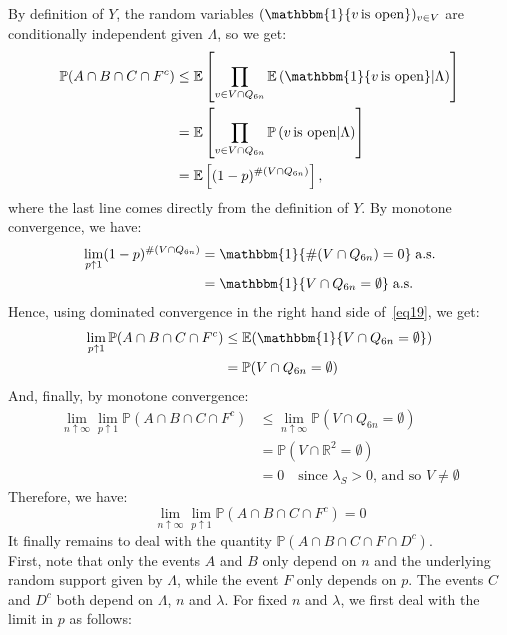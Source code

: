 \documentclass[10pt,a4paper]{amsart}
\theoremstyle{exampstyle}
\theoremstyle{exampnotations}
\begin{document}
By definition of $Y$, the random variables $(\mathbbm{1} \lbrace v \, \text{is open} \rbrace )_{v \in V}$ are conditionally independent given $\Lambda$, so we get:
\begin{align}
    \nonumber \mathbb{P}(A \cap B \cap C \cap F^c) &\leq \mathbb{E}\left[\prod_{v \in V \cap Q_{6n}}\mathbb{E}\left( \mathbbm{1}\lbrace v \, \text{is open} \rbrace \vert \Lambda \right)\right]
    \\ \nonumber &= \mathbb{E}\left[\prod_{v \in V \cap Q_{6n}}\mathbb{P}\left( v \, \text{is open} \vert \Lambda \right)\right]
    \\ \label{eq19} &= \mathbb{E}\left[(1-p)^{\#(V \cap Q_{6n})}\right], 
\end{align}
where the last line comes directly from the definition of $Y$. By monotone convergence, we have:
\begin{align*}
  \lim_{p \uparrow 1}(1-p)^{\#(V \cap Q_{6n})} &= \mathbbm{1}\lbrace \#(V \cap Q_{6n}) = 0 \rbrace \; \text{a.s.}
  \\ &= \mathbbm{1}\lbrace V \cap Q_{6n} = \emptyset \rbrace \; \text{a.s.}  
\end{align*}
Hence, using dominated convergence in the right hand side of~\eqref{eq19}, we get:
\begin{align*}
\lim_{p \uparrow 1} \mathbb{P}(A \cap B \cap C \cap F^c) &\leq \mathbb{E}(\mathbbm{1}\lbrace V \cap Q_{6n} = \emptyset \rbrace)
\\ &= \mathbb{P}(V \cap Q_{6n} = \emptyset)
\end{align*}
And, finally, by monotone convergence:
\begin{align*}
\lim_{n \uparrow \infty}\lim_{p \uparrow 1} \mathbb{P}(A \cap B \cap C \cap F^c) &\leq \lim_{n \uparrow \infty} \mathbb{P}(V \cap Q_{6n} = \emptyset)
\\ &= \mathbb{P}(V \cap \mathbb{R}^{2} = \emptyset)
\\ &= 0 \quad \text{since $\lambda_{S} > 0$, and so $V \neq \emptyset$}
\end{align*}
Therefore, we have:
\begin{equation}
    \label{eq20}
    \lim_{n \uparrow \infty}\lim_{p \uparrow 1} \mathbb{P}(A \cap B \cap C \cap F^c) = 0
\end{equation}
It finally remains to deal with the quantity $\mathbb{P}(A \cap B \cap C \cap F \cap D^{c})$. \\
First, note that only the events $A$ and $B$ only depend on $n$ and the underlying random support given by $\Lambda$, while the event $F$ only depends on $p$. The events $C$ and $D^c$ both depend on $\Lambda$, $n$ and $\lambda$. For fixed $n$ and $\lambda$, we first deal with the limit in $p$ as follows:
\end{document}
